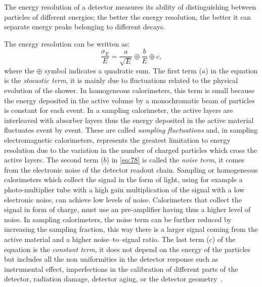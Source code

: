The energy resolution of a detector measures its ability of distinguishing
between particles of different energies; the better the energy resolution, the
better it can separate energy peaks belonging to different decays.

The energy resolution can be written as:
\begin{equation}
  \label{eq:78}
  \frac{\sigma_E}{E} = \frac{a}{\sqrt{E}} \oplus \frac{b}{E} \oplus c,
\end{equation}
where the $\oplus$ symbol indicates a quadratic sum. The first term ($a$) in the
equation is the \emph{stocastic term}, it is mainly due to fluctuations related
to the physical evolution of the shower. In homogeneous calorimeters, this term
is small because the energy deposited in the active volume by a monochromatic
beam of particles is constant for each event. In a sampling calorimeter, the
active layers are interleaved with absorber layers thus the energy deposited in
the active material fluctuates event by event. These are called \emph{sampling
  fluctuations} and, in sampling electromagnetic calorimeters, represents the
greatest limitation to energy resolution due to the variation in the number of
charged particles which cross the active layers. The second term ($b$) in
\cref{eq:78} is called the \emph{noise term}, it comes from the electronic noise
of the detector readout chain. Sampling or homogeneous calorimeters which
collect the signal in the form of light, using for example a photo-multiplier
tube with a high gain multiplication of the signal with a low electronic noise,
can achieve low levels of noise. Calorimeters that collect the signal in form of
charge, must use an pre-amplifier having thus a higher level of noise. In
sampling calorimeters, the noise term can be further reduced by increasing the
sampling fraction, this way there is a larger signal coming from the active
material and a higher noise--to--signal ratio. The last term ($c$) of the
equation is the \emph{constant term}, it does not depend on the energy of the
particles but includes all the non uniformities in the detector response such as
instrumental effect, imperfections in the calibration of different parts of the
detector, radiation damage, detector aging, or the detector
geometry~\cite{Calorimetry}.
